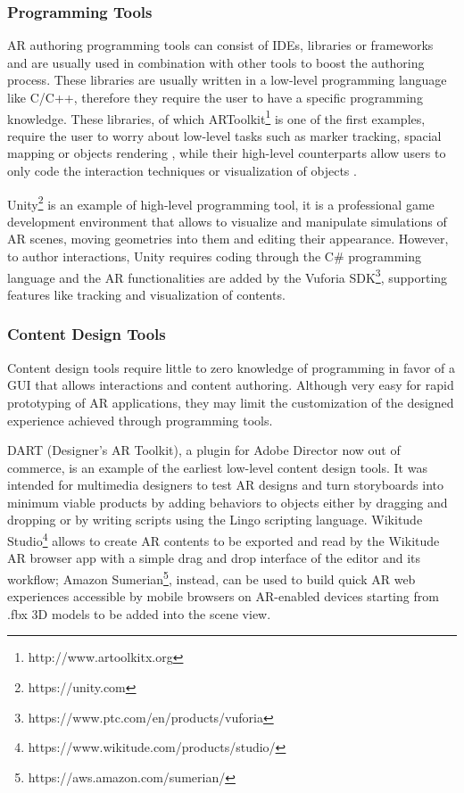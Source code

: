 \subsubsection{Programming Tools}
\label{subsec:related-programming-tools}
AR authoring programming tools can consist of IDEs, libraries or frameworks and are usually used in combination with other tools to boost the authoring process.
These libraries are usually written in a low-level programming language like C/C++, therefore they require the user to have a specific programming knowledge. These libraries, of which ARToolkit\footnote{http://www.artoolkitx.org} \cite{kato1999marker} is one of the first examples, require the user to worry about low-level tasks such as marker tracking, spacial mapping or objects rendering \cite{stephanidis_authoring_2020},  while their high-level counterparts allow users to only code the interaction techniques or visualization of objects \cite{stephanidis_authoring_2020}.

Unity\footnote{https://unity.com} is an example of high-level programming tool, it is a professional game development environment that allows to visualize and manipulate simulations of AR scenes, moving geometries into them and editing their appearance. However, to author interactions, Unity requires coding through the C\# programming language and the AR functionalities are added by the Vuforia SDK\footnote{https://www.ptc.com/en/products/vuforia}, supporting features like tracking and visualization of contents.

\subsubsection{Content Design Tools}
\label{subsec:related-content-design-tools}
Content design tools require little to zero knowledge of programming in favor of a GUI that allows interactions and content authoring. Although very easy for rapid prototyping of AR applications, they may limit the customization of the designed experience achieved through programming tools.

DART (Designer's AR Toolkit), a plugin for Adobe Director now out of commerce, is an example of the earliest low-level content design tools. It was intended for multimedia designers to test AR designs and turn storyboards into minimum viable products by adding behaviors to objects either by dragging and dropping or by writing scripts using the Lingo scripting language. Wikitude Studio\footnote{https://www.wikitude.com/products/studio/} allows to create AR contents to be exported and read by the Wikitude AR browser app with a simple drag and drop interface of the editor and its workflow; Amazon Sumerian\footnote{https://aws.amazon.com/sumerian/}, instead, can be used to build quick AR web experiences accessible by mobile browsers on AR-enabled devices starting from .fbx 3D models to be added into the scene view.

